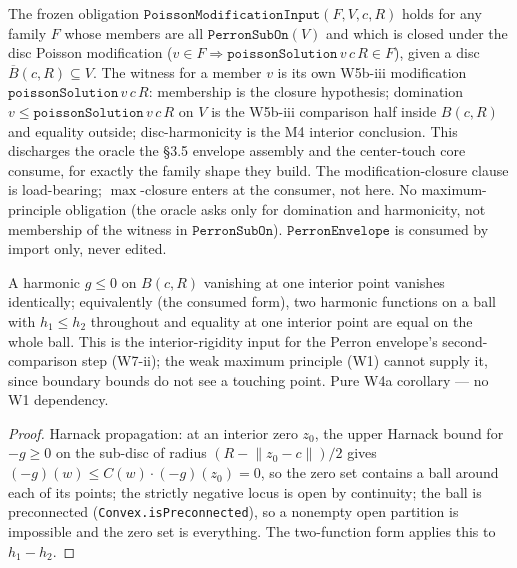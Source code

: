 \begin{lemma}
\label{lem:perron-envelope-poisson-modification-input}
The frozen obligation \(\texttt{PoissonModificationInput}(F, V, c, R)\) holds
for any family \(F\) whose members are all \(\texttt{PerronSubOn}(V)\) and
which is closed under the disc Poisson modification
(\(v \in F \Rightarrow \texttt{poissonSolution}\,v\,c\,R \in F\)), given a
disc \(\overline{B}(c,R) \subseteq V\).  The witness for a member \(v\) is
its own W5b-iii modification \(\texttt{poissonSolution}\,v\,c\,R\):
membership is the closure hypothesis; domination
\(v \le \texttt{poissonSolution}\,v\,c\,R\) on \(V\) is the W5b-iii
comparison half inside \(B(c,R)\) and equality outside; disc-harmonicity is
the M4 interior conclusion.  This discharges the oracle the §3.5 envelope
assembly and the center-touch core consume, for exactly the family shape
they build.  The modification-closure clause is load-bearing;
\(\max\)-closure enters at the consumer, not here.  No maximum-principle
obligation (the oracle asks only for domination and harmonicity, not
membership of the witness in \(\texttt{PerronSubOn}\)).  \(\texttt{PerronEnvelope}\)
is consumed by import only, never edited.
\leanok
\end{lemma}

\begin{lemma}
\label{lem:harnack-strong-max-ball}
A harmonic \(g \le 0\) on \(B(c, R)\) vanishing at one interior point
vanishes identically; equivalently (the consumed form), two harmonic
functions on a ball with \(h_1 \le h_2\) throughout and equality at
one interior point are equal on the whole ball.  This is the
interior-rigidity input for the Perron envelope's second-comparison
step (W7-ii); the weak maximum principle (W1) cannot supply it, since
boundary bounds do not see a touching point.  Pure W4a corollary —
no W1 dependency.
\leanok
\end{lemma}
\begin{proof}\leanok
Harnack propagation: at an interior zero \(z_0\), the upper Harnack
bound for \(-g \ge 0\) on the sub-disc of radius
\((R - \lVert z_0 - c\rVert)/2\) gives
\((-g)(w) \le C(w) \cdot (-g)(z_0) = 0\), so the zero set contains a
ball around each of its points; the strictly negative locus is open by
continuity; the ball is preconnected
(\texttt{Convex.isPreconnected}), so a nonempty open partition is
impossible and the zero set is everything.  The two-function form
applies this to \(h_1 - h_2\).
\end{proof}

